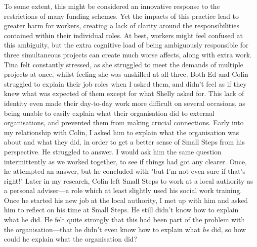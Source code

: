 To some extent, this might be considered an innovative response to the restrictions of many funding schemes. Yet the impacts of this practice lead to greater harm for workers, creating a lack of clarity around the responsibilities contained within their individual roles. At best, workers might feel confused at this ambiguity, but the extra cognitive load of being ambiguously responsible for three simultaneous projects can create much worse affects, along with extra work. Tina felt constantly stressed, as she struggled to meet the demands of multiple projects at once, whilst feeling she was unskilled at all three. Both Ed and Colin struggled to explain their job roles when I asked them, and didn't feel as if they knew what was expected of them except for what Shelly asked for. This lack of identity even made their day-to-day work more difficult on several occasions, as being unable to easily explain what their organisation did to external organisations, and prevented them from making crucial connections. Early into my relationship with Colin, I asked him to explain what the organisation was about and what they did, in order to get a better sense of  Small Steps from his perspective. He struggled to answer. I would ask him the same question intermittently as we worked together, to see if things had got any clearer. Once, he attempted an answer, but he concluded with "but I’m not even sure if that’s right!" Later in my research, Colin left Small Steps to work at a local authority as a personal adviser—a role which at least slightly used his social work training. Once he started his new job at the local authority, I met up with him and asked him to reflect on his time at Small Steps. He still didn't know how to explain what he did. He felt quite strongly that this had been part of the problem with the organisation—that he didn't even know how to explain what \emph{he} did, so how could he explain what the organisation did? 


